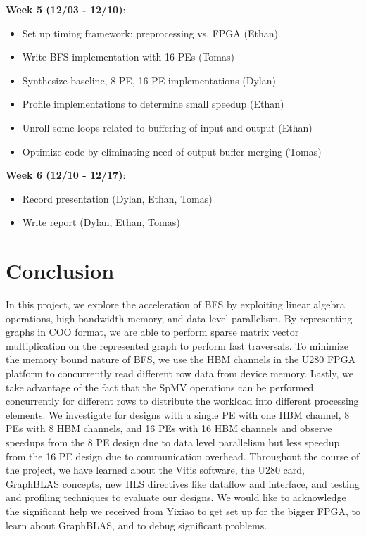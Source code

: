 \documentclass[10pt]{article}
\begin{document}
\noindent \textbf{Week 5 (12/03 - 12/10)}:
\begin{itemize}
  \item Set up timing framework: preprocessing vs. FPGA (Ethan)
  \item Write BFS implementation with 16 PEs (Tomas)
  \item Synthesize baseline, 8 PE, 16 PE implementations (Dylan)
  \item Profile implementations to determine small speedup (Ethan)
  \item Unroll some loops related to buffering of input and output (Ethan)
  \item Optimize code by eliminating need of output buffer merging (Tomas)
\end{itemize}

\noindent \textbf{Week 6 (12/10 - 12/17)}:
\begin{itemize}
  \item Record presentation (Dylan, Ethan, Tomas)
  \item Write report (Dylan, Ethan, Tomas)
\end{itemize}

\section{Conclusion}

\noindent In this project, we explore the acceleration of BFS by exploiting linear algebra 
operations, high-bandwidth memory, and data level parallelism. By representing graphs in
COO format, we are able to perform sparse matrix vector multiplication on the represented graph
to perform fast traversals. To minimize the memory bound nature of BFS, we use the HBM 
channels in the U280 FPGA platform to concurrently read different row data from device memory.
Lastly, we take advantage of the fact that the SpMV operations can be performed concurrently for 
different rows to distribute the workload into different processing elements. We investigate
for designs with a single PE with one HBM channel, 8 PEs with 8 HBM channels, and 16 PEs with 16 HBM
channels and observe speedups from the 8 PE design due to data level parallelism but 
less speedup from the 16 PE design due to communication overhead. Throughout the course of the 
project, we have learned about the Vitis software, the U280 card, GraphBLAS concepts, new HLS directives
like dataflow and interface, and testing and profiling techniques to evaluate our designs. We would
like to acknowledge the significant help we received from Yixiao to get set up for the bigger FPGA, 
to learn about GraphBLAS, and to debug significant problems. 
\end{document}
